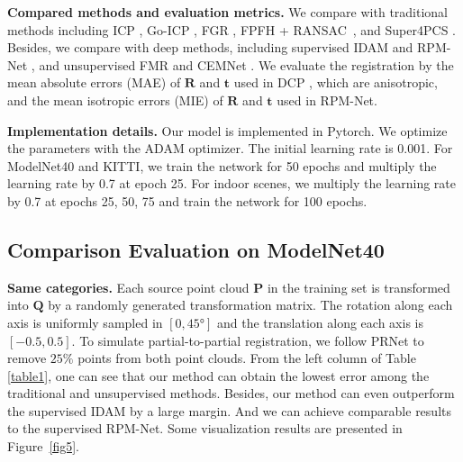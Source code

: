 \documentclass[letterpaper]{article} %
\begin{document}
	\noindent \textbf{Compared methods and evaluation metrics.} We compare with traditional methods including ICP \cite{besl1992method}, Go-ICP \cite{yang2013go}, FGR \cite{zhou2016fast}, FPFH + RANSAC~\cite{fischler1981random}, and Super4PCS \cite{mellado2014super}. Besides, we compare with deep methods, including supervised IDAM \cite{li2020iterative} and RPM-Net \cite{yew2020rpm}, and unsupervised FMR \cite{huang2020feature} and CEMNet \cite{jiang2021CEMNet}. %
	We evaluate the registration by the mean absolute errors (MAE) of $\mathbf{R}$ and $\mathbf{t}$ used in DCP \cite{wang2019deep}, which are anisotropic, and the mean isotropic errors (MIE) of $\mathbf{R}$ and $\mathbf{t}$ used in RPM-Net.
	
	\noindent \textbf{Implementation details.} Our model is implemented in Pytorch. We optimize the parameters with the ADAM optimizer. The initial learning rate is 0.001. For ModelNet40 and KITTI, we train the network for 50 epochs and multiply the learning rate by 0.7 at epoch 25. For indoor scenes, we multiply the learning rate by 0.7 at epochs 25, 50, 75 and train the network for 100 epochs.
	
	\subsection{Comparison Evaluation on ModelNet40}
	\noindent \textbf{Same categories.}
	Each source point cloud $\mathbf{P}$ in the training set is transformed into $\mathbf{Q}$ by a randomly generated transformation matrix. The rotation along each axis is uniformly sampled in $[0,\ang{45}]$ and the translation along each axis is $[-0.5,0.5]$. To simulate partial-to-partial registration, we follow PRNet \cite{wang2019prnet} to remove $25\%$ points from both point clouds.
	From the left column of Table \ref{table1}, one can see that our method can obtain the lowest error among the traditional and unsupervised methods. Besides, our method can even outperform the supervised IDAM by a large margin. And we can achieve comparable results to the supervised RPM-Net.
	Some visualization results are presented in Figure~\ref{fig5}.%
	
\end{document}

